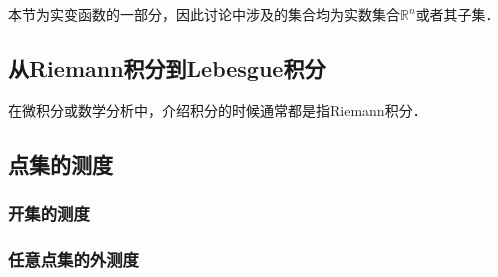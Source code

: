 


本节为实变函数的一部分，因此讨论中涉及的集合均为实数集合$\mathbb{R}^n$或者其子集．


\subsection{从Riemann积分到Lebesgue积分}

在微积分或数学分析中，介绍积分的时候通常都是指Riemann积分．




\subsection{点集的测度}

\subsubsection{开集的测度}



\subsubsection{任意点集的外测度}




















